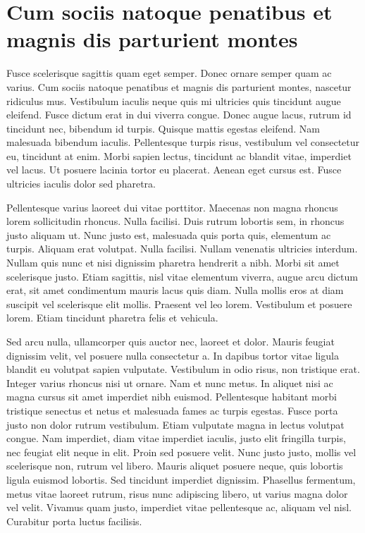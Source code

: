 \chapter{Cum sociis natoque penatibus et magnis dis parturient montes}

Fusce scelerisque sagittis quam eget semper. Donec ornare semper quam ac varius. Cum sociis natoque penatibus et magnis dis parturient montes, nascetur ridiculus mus. Vestibulum iaculis neque quis mi ultricies quis tincidunt augue eleifend. Fusce dictum erat in dui viverra congue. Donec augue lacus, rutrum id tincidunt nec, bibendum id turpis. Quisque mattis egestas eleifend. Nam malesuada bibendum iaculis. Pellentesque turpis risus, vestibulum vel consectetur eu, tincidunt at enim. Morbi sapien lectus, tincidunt ac blandit vitae, imperdiet vel lacus. Ut posuere lacinia tortor eu placerat. Aenean eget cursus est. Fusce ultricies iaculis dolor sed pharetra.

Pellentesque varius laoreet dui vitae porttitor. Maecenas non magna rhoncus lorem sollicitudin rhoncus. Nulla facilisi. Duis rutrum lobortis sem, in rhoncus justo aliquam ut. Nunc justo est, malesuada quis porta quis, elementum ac turpis. Aliquam erat volutpat. Nulla facilisi. Nullam venenatis ultricies interdum. Nullam quis nunc et nisi dignissim pharetra hendrerit a nibh. Morbi sit amet scelerisque justo. Etiam sagittis, nisl vitae elementum viverra, augue arcu dictum erat, sit amet condimentum mauris lacus quis diam. Nulla mollis eros at diam suscipit vel scelerisque elit mollis. Praesent vel leo lorem. Vestibulum et posuere lorem. Etiam tincidunt pharetra felis et vehicula.

Sed arcu nulla, ullamcorper quis auctor nec, laoreet et dolor. Mauris feugiat dignissim velit, vel posuere nulla consectetur a. In dapibus tortor vitae ligula blandit eu volutpat sapien vulputate. Vestibulum in odio risus, non tristique erat. Integer varius rhoncus nisi ut ornare. Nam et nunc metus. In aliquet nisi ac magna cursus sit amet imperdiet nibh euismod. Pellentesque habitant morbi tristique senectus et netus et malesuada fames ac turpis egestas. Fusce porta justo non dolor rutrum vestibulum. Etiam vulputate magna in lectus volutpat congue. Nam imperdiet, diam vitae imperdiet iaculis, justo elit fringilla turpis, nec feugiat elit neque in elit. Proin sed posuere velit. Nunc justo justo, mollis vel scelerisque non, rutrum vel libero. Mauris aliquet posuere neque, quis lobortis ligula euismod lobortis. Sed tincidunt imperdiet dignissim. Phasellus fermentum, metus vitae laoreet rutrum, risus nunc adipiscing libero, ut varius magna dolor vel velit. Vivamus quam justo, imperdiet vitae pellentesque ac, aliquam vel nisl. Curabitur porta luctus facilisis.


